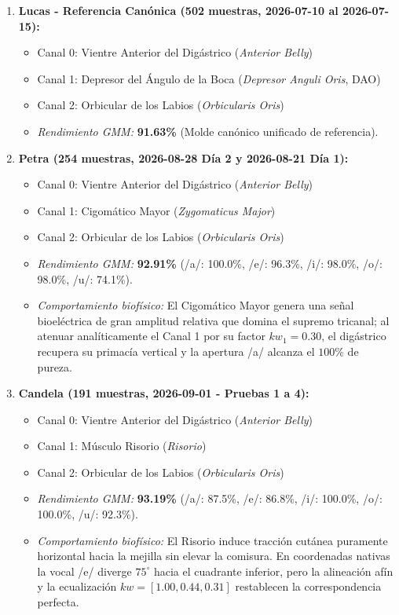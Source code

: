 \documentclass[11pt,a4paper]{article}
\begin{document}
\begin{enumerate}
    \item \textbf{Lucas - Referencia Canónica (502 muestras, 2026-07-10 al 2026-07-15):}
    \begin{itemize}
        \item Canal 0: Vientre Anterior del Digástrico (\textit{Anterior Belly})
        \item Canal 1: Depresor del Ángulo de la Boca (\textit{Depresor Anguli Oris}, DAO)
        \item Canal 2: Orbicular de los Labios (\textit{Orbicularis Oris})
        \item \textit{Rendimiento GMM:} \textbf{91.63\%} (Molde canónico unificado de referencia).
    \end{itemize}

    \item \textbf{Petra (254 muestras, 2026-08-28 Día 2 y 2026-08-21 Día 1):}
    \begin{itemize}
        \item Canal 0: Vientre Anterior del Digástrico (\textit{Anterior Belly})
        \item Canal 1: Cigomático Mayor (\textit{Zygomaticus Major})
        \item Canal 2: Orbicular de los Labios (\textit{Orbicularis Oris})
        \item \textit{Rendimiento GMM:} \textbf{92.91\%} (/a/: 100.0\%, /e/: 96.3\%, /i/: 98.0\%, /o/: 98.0\%, /u/: 74.1\%).
        \item \textit{Comportamiento biofísico:} El Cigomático Mayor genera una señal bioeléctrica de gran amplitud relativa que domina el supremo tricanal; al atenuar analíticamente el Canal 1 por su factor $kw_1 = 0.30$, el digástrico recupera su primacía vertical y la apertura /a/ alcanza el $100\%$ de pureza.
    \end{itemize}

    \item \textbf{Candela (191 muestras, 2026-09-01 - Pruebas 1 a 4):}
    \begin{itemize}
        \item Canal 0: Vientre Anterior del Digástrico (\textit{Anterior Belly})
        \item Canal 1: Músculo Risorio (\textit{Risorio})
        \item Canal 2: Orbicular de los Labios (\textit{Orbicularis Oris})
        \item \textit{Rendimiento GMM:} \textbf{93.19\%} (/a/: 87.5\%, /e/: 86.8\%, /i/: 100.0\%, /o/: 100.0\%, /u/: 92.3\%).
        \item \textit{Comportamiento biofísico:} El Risorio induce tracción cutánea puramente horizontal hacia la mejilla sin elevar la comisura. En coordenadas nativas la vocal /e/ diverge $75^\circ$ hacia el cuadrante inferior, pero la alineación afín y la ecualización $kw = [1.00, 0.44, 0.31]$ restablecen la correspondencia perfecta.
    \end{itemize}


\end{enumerate}
\end{document}
